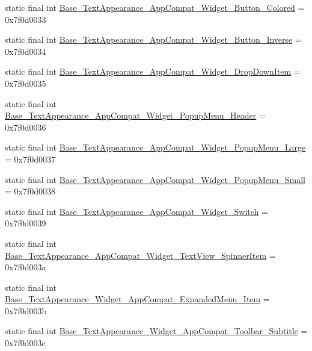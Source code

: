 \begin{DoxyCompactItemize}
\item 
static final int \mbox{\hyperlink{classandroid_1_1support_1_1v7_1_1appcompat_1_1_r_1_1style_a9fa3c71c367abfcedbbb7ac29884c82b}{Base\+\_\+\+Text\+Appearance\+\_\+\+App\+Compat\+\_\+\+Widget\+\_\+\+Button\+\_\+\+Colored}} = 0x7f0d0033
\item 
static final int \mbox{\hyperlink{classandroid_1_1support_1_1v7_1_1appcompat_1_1_r_1_1style_a75ec267d85c6e46c57ff7717ceafad6a}{Base\+\_\+\+Text\+Appearance\+\_\+\+App\+Compat\+\_\+\+Widget\+\_\+\+Button\+\_\+\+Inverse}} = 0x7f0d0034
\item 
static final int \mbox{\hyperlink{classandroid_1_1support_1_1v7_1_1appcompat_1_1_r_1_1style_a4d7e47ebc08a4b842b8fabdf576f3e3d}{Base\+\_\+\+Text\+Appearance\+\_\+\+App\+Compat\+\_\+\+Widget\+\_\+\+Drop\+Down\+Item}} = 0x7f0d0035
\item 
static final int \mbox{\hyperlink{classandroid_1_1support_1_1v7_1_1appcompat_1_1_r_1_1style_abc764e973c2ad2b2f6431c1aba4cc2b3}{Base\+\_\+\+Text\+Appearance\+\_\+\+App\+Compat\+\_\+\+Widget\+\_\+\+Popup\+Menu\+\_\+\+Header}} = 0x7f0d0036
\item 
static final int \mbox{\hyperlink{classandroid_1_1support_1_1v7_1_1appcompat_1_1_r_1_1style_acec204e57bed4bc07073071d0a8a42dd}{Base\+\_\+\+Text\+Appearance\+\_\+\+App\+Compat\+\_\+\+Widget\+\_\+\+Popup\+Menu\+\_\+\+Large}} = 0x7f0d0037
\item 
static final int \mbox{\hyperlink{classandroid_1_1support_1_1v7_1_1appcompat_1_1_r_1_1style_ad6af5d6b56317b8ec58f539b1888a924}{Base\+\_\+\+Text\+Appearance\+\_\+\+App\+Compat\+\_\+\+Widget\+\_\+\+Popup\+Menu\+\_\+\+Small}} = 0x7f0d0038
\item 
static final int \mbox{\hyperlink{classandroid_1_1support_1_1v7_1_1appcompat_1_1_r_1_1style_a51725e1cbcc9c36e3ad88184aea4b38a}{Base\+\_\+\+Text\+Appearance\+\_\+\+App\+Compat\+\_\+\+Widget\+\_\+\+Switch}} = 0x7f0d0039
\item 
static final int \mbox{\hyperlink{classandroid_1_1support_1_1v7_1_1appcompat_1_1_r_1_1style_ab9e96eae581adf2eb8614bbda6ac7394}{Base\+\_\+\+Text\+Appearance\+\_\+\+App\+Compat\+\_\+\+Widget\+\_\+\+Text\+View\+\_\+\+Spinner\+Item}} = 0x7f0d003a
\item 
static final int \mbox{\hyperlink{classandroid_1_1support_1_1v7_1_1appcompat_1_1_r_1_1style_ae7658a7cd5c3425ebc9aa6bbb54a6a45}{Base\+\_\+\+Text\+Appearance\+\_\+\+Widget\+\_\+\+App\+Compat\+\_\+\+Expanded\+Menu\+\_\+\+Item}} = 0x7f0d003b
\item 
static final int \mbox{\hyperlink{classandroid_1_1support_1_1v7_1_1appcompat_1_1_r_1_1style_ac64a505ec7328631cc1a2fe22d9c778a}{Base\+\_\+\+Text\+Appearance\+\_\+\+Widget\+\_\+\+App\+Compat\+\_\+\+Toolbar\+\_\+\+Subtitle}} = 0x7f0d003c

\end{DoxyCompactItemize}
